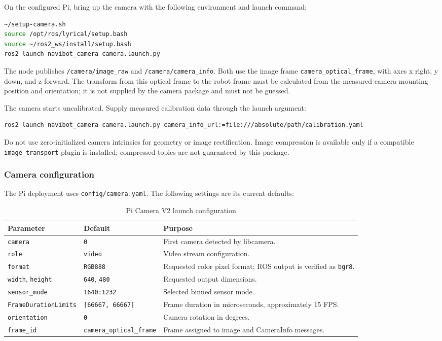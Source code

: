 On the configured Pi, bring up the camera with the following environment and launch command:
\begin{lstlisting}[language=bash]
~/setup-camera.sh
source /opt/ros/lyrical/setup.bash
source ~/ros2_ws/install/setup.bash
ros2 launch navibot_camera camera.launch.py
\end{lstlisting}

The node publishes \texttt{/camera/image\_raw} and \texttt{/camera/camera\_info}. Both use the image frame \texttt{camera\_optical\_frame}, with axes x right, y down, and z forward. The transform from this optical frame to the robot frame must be calculated from the measured camera mounting position and orientation; it is not supplied by the camera package and must not be guessed.

The camera starts uncalibrated. Supply measured calibration data through the launch argument:
\begin{lstlisting}[language=bash]
ros2 launch navibot_camera camera.launch.py camera_info_url:=file:///absolute/path/calibration.yaml
\end{lstlisting}
Do not use zero-initialized camera intrinsics for geometry or image rectification. Image compression is available only if a compatible \texttt{image\_transport} plugin is installed; compressed topics are not guaranteed by this package.

\subsubsection{Camera configuration}
The Pi deployment uses \texttt{config/camera.yaml}. The following settings are its current defaults:
\begin{table}[!htbp]
    \centering
    \small
    \renewcommand{\arraystretch}{1.2}
    \begin{tabular}{p{4.2cm}p{3.2cm}p{7.5cm}}
        \toprule
        \textbf{Parameter} & \textbf{Default} & \textbf{Purpose} \\
        \midrule
        \texttt{camera} & \texttt{0} & First camera detected by libcamera. \\
        \texttt{role} & \texttt{video} & Video stream configuration. \\
        \texttt{format} & \texttt{RGB888} & Requested color pixel format; ROS output is verified as \texttt{bgr8}. \\
        \texttt{width}, \texttt{height} & \texttt{640}, \texttt{480} & Requested output dimensions. \\
        \texttt{sensor\_mode} & \texttt{1640:1232} & Selected binned sensor mode. \\
        \texttt{FrameDurationLimits} & \texttt{[66667, 66667]} & Frame duration in microseconds, approximately 15 FPS. \\
        \texttt{orientation} & \texttt{0} & Camera rotation in degrees. \\
        \texttt{frame\_id} & \texttt{camera\_optical\_frame} & Frame assigned to image and CameraInfo messages. \\
        \bottomrule
    \end{tabular}
    \caption{Pi Camera V2 launch configuration}
\end{table}

